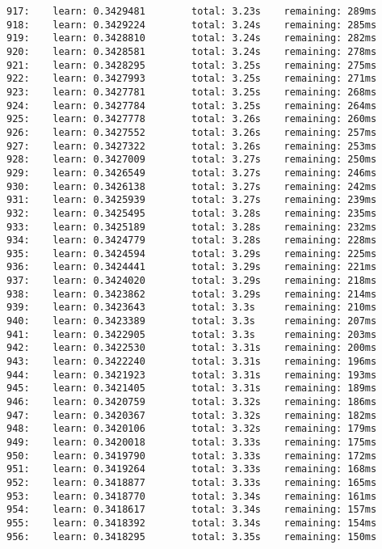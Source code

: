 \documentclass[11pt]{article}
\begin{document}
\begin{Verbatim}[commandchars=\\\{\}]
917:    learn: 0.3429481        total: 3.23s    remaining: 289ms
918:    learn: 0.3429224        total: 3.24s    remaining: 285ms
919:    learn: 0.3428810        total: 3.24s    remaining: 282ms
920:    learn: 0.3428581        total: 3.24s    remaining: 278ms
921:    learn: 0.3428295        total: 3.25s    remaining: 275ms
922:    learn: 0.3427993        total: 3.25s    remaining: 271ms
923:    learn: 0.3427781        total: 3.25s    remaining: 268ms
924:    learn: 0.3427784        total: 3.25s    remaining: 264ms
925:    learn: 0.3427778        total: 3.26s    remaining: 260ms
926:    learn: 0.3427552        total: 3.26s    remaining: 257ms
927:    learn: 0.3427322        total: 3.26s    remaining: 253ms
928:    learn: 0.3427009        total: 3.27s    remaining: 250ms
929:    learn: 0.3426549        total: 3.27s    remaining: 246ms
930:    learn: 0.3426138        total: 3.27s    remaining: 242ms
931:    learn: 0.3425939        total: 3.27s    remaining: 239ms
932:    learn: 0.3425495        total: 3.28s    remaining: 235ms
933:    learn: 0.3425189        total: 3.28s    remaining: 232ms
934:    learn: 0.3424779        total: 3.28s    remaining: 228ms
935:    learn: 0.3424594        total: 3.29s    remaining: 225ms
936:    learn: 0.3424441        total: 3.29s    remaining: 221ms
937:    learn: 0.3424020        total: 3.29s    remaining: 218ms
938:    learn: 0.3423862        total: 3.29s    remaining: 214ms
939:    learn: 0.3423643        total: 3.3s     remaining: 210ms
940:    learn: 0.3423389        total: 3.3s     remaining: 207ms
941:    learn: 0.3422905        total: 3.3s     remaining: 203ms
942:    learn: 0.3422530        total: 3.31s    remaining: 200ms
943:    learn: 0.3422240        total: 3.31s    remaining: 196ms
944:    learn: 0.3421923        total: 3.31s    remaining: 193ms
945:    learn: 0.3421405        total: 3.31s    remaining: 189ms
946:    learn: 0.3420759        total: 3.32s    remaining: 186ms
947:    learn: 0.3420367        total: 3.32s    remaining: 182ms
948:    learn: 0.3420106        total: 3.32s    remaining: 179ms
949:    learn: 0.3420018        total: 3.33s    remaining: 175ms
950:    learn: 0.3419790        total: 3.33s    remaining: 172ms
951:    learn: 0.3419264        total: 3.33s    remaining: 168ms
952:    learn: 0.3418877        total: 3.33s    remaining: 165ms
953:    learn: 0.3418770        total: 3.34s    remaining: 161ms
954:    learn: 0.3418617        total: 3.34s    remaining: 157ms
955:    learn: 0.3418392        total: 3.34s    remaining: 154ms
956:    learn: 0.3418295        total: 3.35s    remaining: 150ms

\end{Verbatim}
\end{document}
